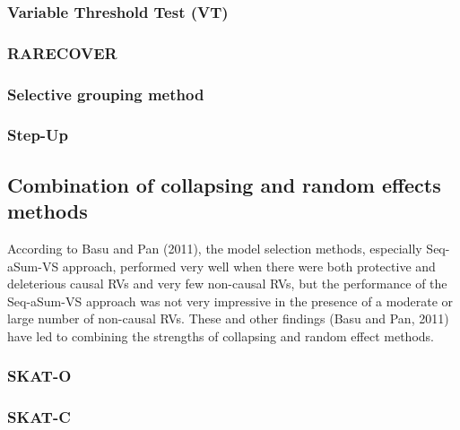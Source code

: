 \documentclass[
]{book}
\begin{document}
\hypertarget{variable-threshold-test-vt}{%
\subsubsection{Variable Threshold Test (VT)}\label{variable-threshold-test-vt}}

\hypertarget{rarecover}{%
\subsubsection{RARECOVER}\label{rarecover}}

\hypertarget{selective-grouping-method}{%
\subsubsection{Selective grouping method}\label{selective-grouping-method}}

\hypertarget{step-up}{%
\subsubsection{Step-Up}\label{step-up}}

\hypertarget{combination-of-collapsing-and-random-effects-methods}{%
\subsection{Combination of collapsing and random effects methods}\label{combination-of-collapsing-and-random-effects-methods}}

According to Basu and Pan (2011), the model selection methods, especially Seq-aSum-VS approach, performed very well when there were both protective and deleterious causal RVs and very few non-causal RVs, but the performance of the Seq-aSum-VS approach was not very impressive in the presence of a moderate or large number of non-causal RVs. These and other ﬁndings (Basu and Pan, 2011) have led to combining the strengths of collapsing and random eﬀect methods.

\hypertarget{skat-o}{%
\subsubsection{SKAT-O}\label{skat-o}}

\hypertarget{skat-c}{%
\subsubsection{SKAT-C}\label{skat-c}}
\end{document}
